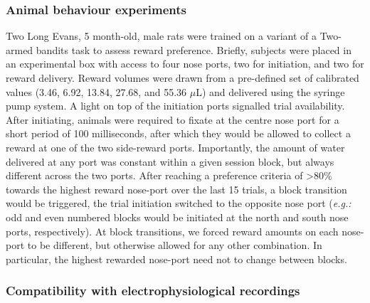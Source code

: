 \subsubsection*{Animal behaviour experiments}
Two Long Evans, 5 month-old, male rats were trained on a variant of a Two-armed bandits task \citep{Ito2009} to assess reward preference. Briefly, subjects were placed in an experimental box with access to four nose ports, two for initiation, and two for reward delivery. Reward volumes were drawn from a pre-defined set of calibrated values (3.46, 6.92, 13.84, 27.68, and 55.36 $\mu$L) and delivered using the syringe pump system. A light on top of the initiation ports signalled trial availability. After initiating, animals were required to fixate at the centre nose port for a short period of 100 milliseconds, after which they would be allowed to collect a reward at one of the two side-reward ports. Importantly, the amount of water delivered at any port was constant within a given session block, but always different across the two ports. After reaching a preference criteria of >80\% towards the highest reward nose-port over the last 15 trials, a block transition would be triggered, the trial initiation switched to the opposite nose port (\textit{e.g.:} odd and even numbered blocks would be initiated at the north and south nose ports, respectively). At block transitions, we forced reward amounts on each nose-port to be different, but otherwise allowed for any other combination. In particular, the highest rewarded nose-port need not to change between blocks.


\subsubsection*{Compatibility with electrophysiological recordings}

